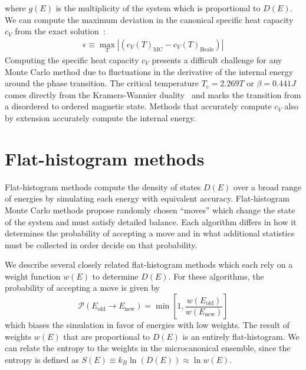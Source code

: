 where $g(E)$ is the multiplicity of the system which is proportional to
$D(E)$. We can compute the maximum deviation in the canonical specific heat capacity $c_V$ from the exact solution~\cite{schneider2017convergence, shakirov2018convergence,
barash2017control,barash2017gpu}:
\begin{align}
\epsilon \equiv \max_T \left|\left(c_V(T)_{\text{MC}} - c_V(T)_{\text{Beale}}\right)\right|
\end{align}
Computing the specific heat capacity $c_V$ presents a difficult challenge for
any Monte Carlo method due to fluctuations in the derivative of the
internal energy around the phase transition. The critical temperature $T_c = 2.
269T$ or $\beta= 0.441J$ comes directly from the Kramers-Wannier
duality~\cite{bhattacharjee1995fifty} and marks the transition from a
disordered to ordered magnetic state. Methods that accurately compute $c_V$
also by extension accurately compute the internal energy.

\section{Flat-histogram methods}\label{sec:histogram}
Flat-histogram methods compute the density of states $D(E)$ over a broad range
of energies by simulating each energy with equivalent accuracy. Flat-histogram
Monte Carlo methods propose randomly chosen ``moves'' which change the state of
the system and must satisfy detailed balance.  Each algorithm differs in how it
determines the probability of accepting a move and in what additional statistics
must be collected in order decide on that probability.

We describe several closely related flat-histogram methods which each rely on a
weight function $w(E)$ to determine $D(E)$.  For these algorithms, the
probability of accepting a move is given by
\begin{equation}
	\mathcal{P}(E_\text{old} \rightarrow E_\text{new})
	= \min\left[1,\frac{w(E_\text{old})}{w(E_\text{new})}\right]
\end{equation}
which biases the simulation in favor of energies with low weights. The result of
weights $w(E)$ that are proportional to $D(E)$ is an entirely flat-histogram. We
can relate the entropy to the weights in the microcanonical ensemble, since the
entropy is defined as $S(E) \equiv k_B\ln(D(E)) \approx \ln w(E)$.

